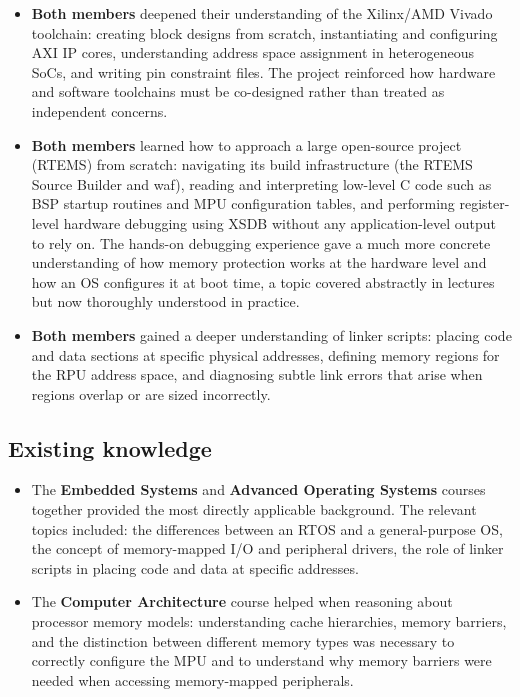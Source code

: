 \documentclass[10pt,a4]{article}
\begin{document}
\begin{itemize}
  \item \textbf{Both members} deepened their understanding of the Xilinx/AMD
        Vivado toolchain: creating block designs from scratch, instantiating and
        configuring AXI IP cores, understanding address space assignment in
        heterogeneous SoCs, and writing pin constraint files.
        The project reinforced how hardware and software toolchains must be
        co-designed rather than treated as independent concerns.

  \item \textbf{Both members} learned how to approach a large open-source
        project (RTEMS) from scratch: navigating its build infrastructure
        (the RTEMS Source Builder and waf), reading and interpreting low-level
        C code such as BSP startup routines and MPU configuration tables, and
        performing register-level hardware debugging using XSDB without any
        application-level output to rely on.
        The hands-on debugging experience gave a much more concrete
        understanding of how memory protection works at the hardware level and
        how an OS configures it at boot time, a topic covered abstractly in
        lectures but now thoroughly understood in practice.

  \item \textbf{Both members} gained a deeper understanding of linker scripts:
        placing code and data sections at specific physical addresses, defining
        memory regions for the RPU address space, and diagnosing subtle link
        errors that arise when regions overlap or are sized incorrectly.
\end{itemize}


\subsection{Existing knowledge}

\begin{itemize}
  \item The \textbf{Embedded Systems} and \textbf{Advanced Operating Systems}
        courses together provided the most directly applicable background.
        The relevant topics included: the differences between an RTOS and a
        general-purpose OS, the concept of memory-mapped I/O and
        peripheral drivers, the role of linker scripts in placing code and data
        at specific addresses.

  \item The \textbf{Computer Architecture} course helped when reasoning about
        processor memory models: understanding cache hierarchies, memory
        barriers, and the distinction between different memory types was
        necessary to correctly configure the MPU and to understand why memory
        barriers were needed when accessing memory-mapped peripherals.
\end{itemize}
\end{document}
